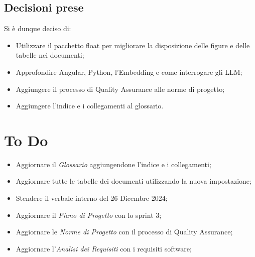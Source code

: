 \documentclass[a4paper, 12pt]{article}
\begin{document}
\subsection{Decisioni prese}
Si è dunque deciso di:
\begin{itemize}
    \item Utilizzare il pacchetto float per migliorare la disposizione delle figure e delle tabelle nei documenti;
    \item Approfondire Angular, Python, l'Embedding e come interrogare gli LLM;
    \item Aggiungere il processo di Quality Assurance alle norme di progetto;
    \item Aggiungere l'indice e i collegamenti al glossario.
\end{itemize}
\section{To Do}
\begin{itemize}
    \item Aggiornare il \textit{Glossario} aggiungendone l'indice e i collegamenti;
    \item Aggiornare tutte le tabelle dei documenti utilizzando la nuova impostazione;
    \item Stendere il verbale interno del 26 Dicembre 2024;
    \item Aggiornare il \textit{Piano di Progetto} con lo sprint 3;
    \item Aggiornare le \textit{Norme di Progetto} con il processo di Quality Assurance;
    \item Aggiornare l'\textit{Analisi dei Requisiti} con i requisiti software;
\end{itemize}
\end{document}
